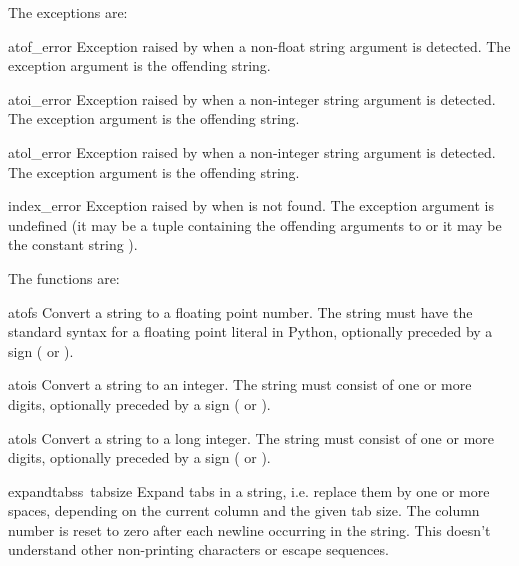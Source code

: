 The exceptions are:

\renewcommand{\indexsubitem}{(exception in module string)}

\begin{excdesc}{atof_error}
Exception raised by
when a non-float string argument is detected.
The exception argument is the offending string.
\end{excdesc}

\begin{excdesc}{atoi_error}
Exception raised by
when a non-integer string argument is detected.
The exception argument is the offending string.
\end{excdesc}

\begin{excdesc}{atol_error}
Exception raised by
when a non-integer string argument is detected.
The exception argument is the offending string.
\end{excdesc}

\begin{excdesc}{index_error}
Exception raised by  when  is not found.
The exception argument is undefined (it may be a tuple containing the
offending arguments to  or it may be the constant string
).
\end{excdesc}

The functions are:

\renewcommand{\indexsubitem}{(in module string)}

\begin{funcdesc}{atof}{s}
Convert a string to a floating point number.  The string must have
the standard syntax for a floating point literal in Python, optionally
preceded by a sign (\samp{+} or \samp{-}).
\end{funcdesc}

\begin{funcdesc}{atoi}{s}
Convert a string to an integer.  The string must consist of one or more
digits, optionally preceded by a sign (\samp{+} or \samp{-}).
\end{funcdesc}

\begin{funcdesc}{atol}{s}
Convert a string to a long integer.  The string must consist of one
or more digits, optionally preceded by a sign (\samp{+} or \samp{-}).
\end{funcdesc}

\begin{funcdesc}{expandtabs}{s\, tabsize}
Expand tabs in a string, i.e. replace them by one or more spaces,
depending on the current column and the given tab size.  The column
number is reset to zero after each newline occurring in the string.
This doesn't understand other non-printing characters or escape
sequences.
\end{funcdesc}

